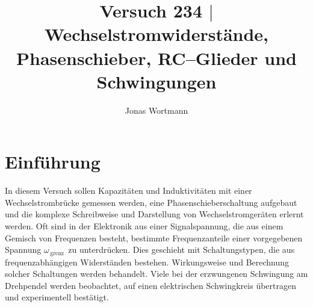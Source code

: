 \documentclass[a4paper,12pt]{article}
\numberwithin{equation}{section}
\begin{document}

\title{Versuch 234 $|$ Wechselstromwiderstände, Phasenschieber, RC--Glieder und Schwingungen}
\author{Jonas Wortmann}
\maketitle
{}


\newpage


\fancyhead[L]{\thepage}
\fancyfoot[C]{}

\tableofcontents


\newpage


\fancyhead[R]{\leftmark\\\rightmark}

\section{Einführung}
In diesem Versuch sollen Kapazitäten und Induktivitäten mit einer Wechselstrombrücke gemessen werden, eine Phasenschieberschaltung aufgebaut und die komplexe Schreibweise und Darstellung von Wechselstromgeräten erlernt werden.
Oft sind in der Elektronik aus einer Signalspannung, die aus einem Gemisch von Frequenzen besteht, bestimmte Frequenzanteile einer vorgegebenen Spannung $\omega _{\,\text{grenz}\,}$ zu unterdrücken.
Dies geschieht mit Schaltungstypen, die aus frequenzabhängigen Widerständen bestehen.
\indent Wirkungsweise und Berechnung solcher Schaltungen werden behandelt.
Viele bei der erzwungenen Schwingung am Drehpendel werden beobachtet, auf einen elektrischen Schwingkreis übertragen und experimentell bestätigt.
\end{document}
